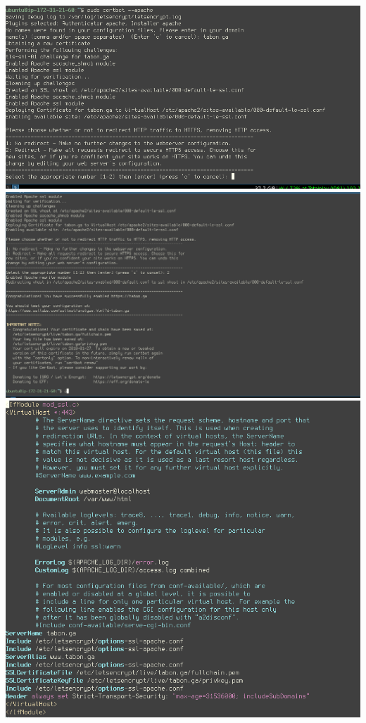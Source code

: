 \documentclass[9pt]{article}
\begin{document}
\includegraphics[width=\textwidth]{cert1}
\includegraphics[width=\textwidth]{cert2}
\includegraphics[width=\textwidth]{apache-ssl}
\end{document}
